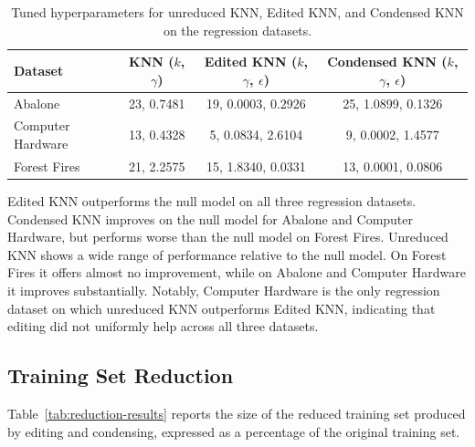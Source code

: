 \documentclass[twoside,11pt]{article}
\begin{document}
\begin{table}[h]
\centering
\begin{tabular}{lccc}
\hline
Dataset & KNN ($k$, $\gamma$) & Edited KNN ($k$, $\gamma$, $\epsilon$) & Condensed KNN ($k$, $\gamma$, $\epsilon$) \\
\hline
Abalone            & 23, 0.7481 & 19, 0.0003, 0.2926 & 25, 1.0899, 0.1326 \\
Computer Hardware  & 13, 0.4328 & 5, 0.0834, 2.6104  & 9, 0.0002, 1.4577  \\
Forest Fires       & 21, 2.2575 & 15, 1.8340, 0.0331 & 13, 0.0001, 0.0806 \\
\hline
\end{tabular}
\caption{Tuned hyperparameters for unreduced KNN, Edited KNN, and Condensed KNN on the regression datasets.}
\label{tab:regression-hyperparams}
\end{table}
Edited KNN outperforms the null model on all three regression datasets. Condensed KNN improves on the null model for Abalone and Computer Hardware, but performs worse than the null model on Forest Fires. Unreduced KNN shows a wide range of performance relative to the null model. On Forest Fires it offers almost no improvement, while on Abalone and Computer Hardware it improves substantially. Notably, Computer Hardware is the only regression dataset on which unreduced KNN outperforms Edited KNN, indicating that editing did not uniformly help across all three datasets.

\subsection{Training Set Reduction}
Table~\ref{tab:reduction-results} reports the size of the reduced training set produced by editing and condensing, expressed as a percentage of the original training set.
\end{document}
